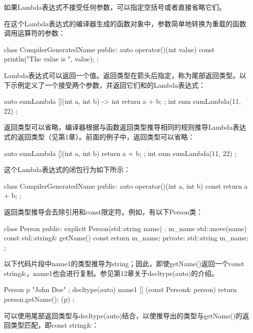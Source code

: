 如果Lambda表达式不接受任何参数，可以指定空括号或者直接省略它们。

在这个Lambda表达式的编译器生成的函数对象中，参数简单地转换为重载的函数调用运算符的参数：

\begin{cpp}
class CompilerGeneratedName
{
    public:
        auto operator()(int value) const { println("The value is {}", value); }
};
\end{cpp}

Lambda表达式可以返回一个值。返回类型在箭头后指定，称为尾部返回类型。以下示例定义了一个接受两个参数，并返回它们和的Lambda表达式：

\begin{cpp}
auto sumLambda { [](int a, int b) -> int { return a + b; } };
int sum { sumLambda(11, 22) };
\end{cpp}

返回类型可以省略，编译器根据与函数返回类型推导相同的规则推导Lambda表达式的返回类型（见第1章）。前面的例子中，返回类型可以省略：

\begin{cpp}
auto sumLambda { [](int a, int b){ return a + b; } };
int sum { sumLambda(11, 22) };
\end{cpp}

这个Lambda表达式的闭包行为如下所示：

\begin{cpp}
class CompilerGeneratedName
{
    public:
        auto operator()(int a, int b) const { return a + b; }
};
\end{cpp}

返回类型推导会去除引用和const限定符。例如，有以下Person类：

\begin{cpp}
class Person
{
    public:
        explicit Person(std::string name) : m_name { std::move(name) } { }
        const std::string& getName() const { return m_name; }
    private:
        std::string m_name;
};
\end{cpp}

以下代码片段中name1的类型推导为string；因此，即使getName()返回一个const string\&，name1也会进行复制。参见第12章关于decltype(auto)的介绍。

\begin{cpp}
Person p { "John Doe" };
decltype(auto) name1 { [] (const Person& person) { return person.getName(); }(p) };
\end{cpp}

可以使用尾部返回类型与decltype(auto)结合，以使推导出的类型与getName()的返回类型匹配，即const string\&：

